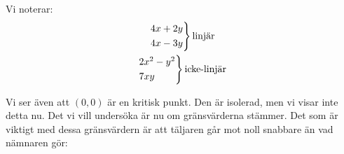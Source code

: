 \par\bigskip
\noindent Vi noterar:
\begin{equation*}
  \begin{gathered}
    \begin{rcases*}
      4x+2y\\
      4x-3y
    \end{rcases*}\text{linjär}\\
    \begin{rcases*}
      2x^2-y^2\\
      7xy
    \end{rcases*}\text{icke-linjär}
  \end{gathered}
\end{equation*}
\par\bigskip
\noindent Vi ser även att $(0,0)$ är en kritisk punkt. Den är isolerad, men vi visar inte detta nu. Det vi vill undersöka är nu om gränsvärderna stämmer. Det som är viktigt med dessa gränsvärdern är att täljaren går mot noll snabbare än vad nämnaren gör:
\par\bigskip


